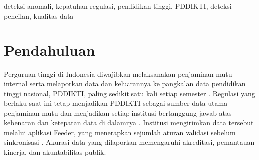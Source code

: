 \documentclass[conference]{IEEEtran}
\begin{document}
\begin{abstract}
Perguruan tinggi di Indonesia melaporkan data akademiknya ke pangkalan data nasional PDDIKTI, dan rekaman yang melanggar aturan pelaporan melemahkan penjaminan mutu dan akreditasi. Makalah ini mengkaji deteksi anomali kepatuhan hanya pada data PDDIKTI, tanpa sistem sumber institusi. Aturan validasi eksplisit yang diambil dari panduan pengguna Feeder PDDIKTI dikombinasikan dengan tiga detektor pencilan tanpa pengawasan: Isolation Forest, Local Outlier Factor, dan autoencoder. Data berasal dari satu institusi dengan tiga program studi dan mencakup 15 semester, termasuk 3.948 rekaman mahasiswa-semester, 348 mata kuliah, dan 1.636 aktivitas mengajar dosen. Karena data telah lolos validasi Feeder, anomali disisipkan ke dalam salinan data, dan deteksi dievaluasi pada 10 penyisipan acak. Aturan mendeteksi pelanggaran eksplisit secara tepat tetapi melewatkan rekaman yang memenuhi semua ambang batas. Detektor pencilan menemukan kembali sebagian rekaman tersebut, dan kinerjanya bergantung pada entitas: untuk aktivitas mengajar, Isolation Forest dan Local Outlier Factor menemukan sekitar dua pertiganya, sedangkan untuk rekaman mahasiswa-semester detektor terbaik menemukan 39 persen. Detektor gabungan mencapai luas area di bawah kurva ROC sebesar 0,982 untuk rekaman mahasiswa-semester. Hasil ini menunjukkan bahwa deteksi berbasis aturan dan pembelajaran mesin saling melengkapi untuk pemeriksaan kepatuhan data akademik.
\end{abstract}

\begin{IEEEkeywords}
\raggedright
deteksi anomali, kepatuhan regulasi, pendidikan tinggi, PDDIKTI, deteksi pencilan, kualitas data
\end{IEEEkeywords}

\section{Pendahuluan}
Perguruan tinggi di Indonesia diwajibkan melaksanakan penjaminan mutu internal serta melaporkan data dan keluarannya ke pangkalan data pendidikan tinggi nasional, PDDIKTI, paling sedikit satu kali setiap semester \cite{permendikbudristek53_2023}. Regulasi yang berlaku saat ini tetap menjadikan PDDIKTI sebagai sumber data utama penjaminan mutu dan menjadikan setiap institusi bertanggung jawab atas kebenaran dan ketepatan data di dalamnya \cite{permendiktisaintek39_2025}. Institusi mengirimkan data tersebut melalui aplikasi Feeder, yang menerapkan sejumlah aturan validasi sebelum sinkronisasi \cite{feeder_guide}. Akurasi data yang dilaporkan memengaruhi akreditasi, pemantauan kinerja, dan akuntabilitas publik.
\end{document}
